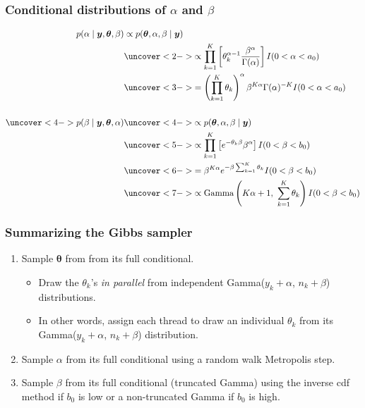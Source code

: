 \documentclass[handout]{beamer}
\providecommand{\vc}[1]{\boldsymbol{#1}}
\numberwithin{equation}{section}
\begin{document}
\begin{frame} 
\frametitle{Conditional distributions of $\alpha$ and $\beta$} \small
\begin{align*}
p(\alpha \mid \vc{y}, \vc{\theta}, \beta) &\propto p(\vc{\theta}, \alpha, \beta \mid \vc{y}) \\
&\uncover<2->{\propto \prod_{k = 1}^K \left [ \theta_k^{\alpha - 1} \frac{\beta^\alpha}{\Gamma(\alpha)} \right ] I(0 < \alpha < a_0)} \\
&\uncover<3->{=\left (\prod_{k = 1}^K \theta_k \right )^\alpha \beta^{K \alpha} \Gamma(\alpha)^{-K} I(0 < \alpha < a_0)} \\ \\
\uncover<4->{p(\beta \mid \vc{y}, \vc{\theta}, \alpha)} &\uncover<4->{\propto p(\vc{\theta}, \alpha, \beta \mid \vc{y})} \\
&\uncover<5->{\propto \prod_{k = 1}^K \left [ e^{-\theta_k \beta} \beta^\alpha \right ] I(0 < \beta < b_0)} \\
&\uncover<6->{=\beta^{K \alpha} e^{- \beta \sum_{k = 1}^K \theta_k} I(0 < \beta < b_0)} \\
&\uncover<7->{\propto \text{Gamma}\left (K \alpha + 1, \ \sum_{k = 1}^K \theta_k \right) I(0 < \beta < b_0)}
\end{align*}
\end{frame}



\begin{frame}
\frametitle{Summarizing the Gibbs sampler}
\begin{enumerate}
\item Sample $\vc{\theta}$ from from its full conditional.
\begin{itemize}
\pause \item Draw the $\theta_k$'s \emph{in parallel} from independent Gamma($y_k + \alpha$, $n_k + \beta$) distributions.
\pause \item In other words, assign each thread to draw an individual $\theta_k$ from its Gamma($y_k + \alpha$, $n_k + \beta$) distribution.
\end{itemize}
\pause \item Sample $\alpha$ from its full conditional using a random walk Metropolis step.
\pause \item Sample $\beta$ from its full conditional (truncated Gamma) using the inverse cdf method if $b_0$ is low or a non-truncated Gamma if $b_0$ is high.
\end{enumerate}

\end{frame}
\end{document}

